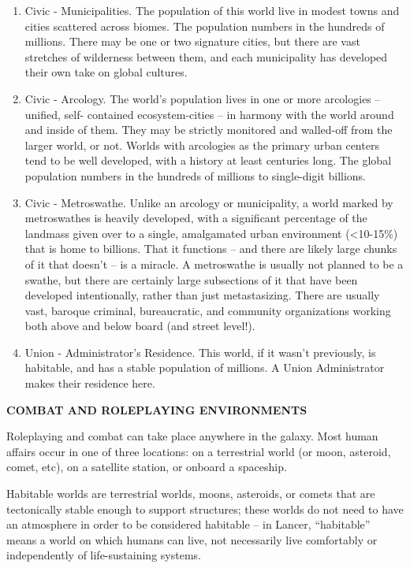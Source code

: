 \begin{enumerate}
    \item Civic - Municipalities. The population of this world live in modest towns and cities scattered across biomes. The population numbers in the hundreds of millions. There may be one or two signature cities, but there are vast stretches of wilderness between them, and each municipality has developed their own take on global cultures.
    \item Civic - Arcology. The world’s population lives in one or more arcologies -- unified, self- contained ecosystem-cities -- in harmony with the world around and inside of them. They may be strictly monitored and walled-off from the larger world, or not. Worlds with arcologies as the primary urban centers tend to be well developed, with a history at least centuries long. The global population numbers in the hundreds of millions to single-digit billions.
    \item Civic - Metroswathe. Unlike an arcology or municipality, a world marked by metroswathes is heavily developed, with a significant percentage of the landmass given over to a single, amalgamated urban environment (<10-15\%) that is home to billions. That it functions -- and there are likely large chunks of it that doesn’t -- is a miracle. A metroswathe is usually not planned to be a swathe, but there are certainly large subsections of it that have been developed intentionally, rather than just metastasizing. There are usually vast, baroque criminal, bureaucratic, and community organizations working both above and below board (and street level!).
    \item Union - Administrator’s Residence. This world, if it wasn’t previously, is habitable, and has a stable population of millions. A Union Administrator makes their residence here.
\end{enumerate}

\textbf{COMBAT AND ROLEPLAYING ENVIRONMENTS}

Roleplaying and combat can take place anywhere in the galaxy. Most human affairs occur in one
of three locations: on a terrestrial world (or moon, asteroid, comet, etc), on a satellite station, or
onboard a spaceship.

Habitable worlds are terrestrial worlds, moons, asteroids, or comets that are tectonically stable
enough to support structures; these worlds do not need to have an atmosphere in order to be
considered habitable -- in Lancer, “habitable” means a world on which humans can live, not
necessarily live comfortably or independently of life-sustaining systems.

